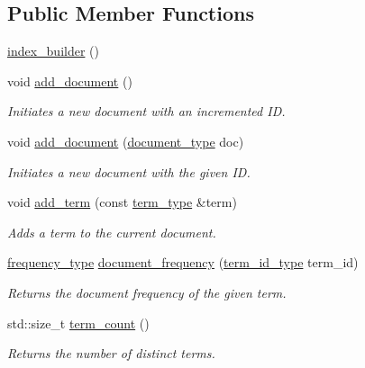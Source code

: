 \subsection*{Public Member Functions}
\begin{DoxyCompactItemize}
\item 
\mbox{\hyperlink{classirk_1_1index__builder_a00c690294474cf2ef39fcf94edc8b594}{index\+\_\+builder}} ()
\item 
void \mbox{\hyperlink{classirk_1_1index__builder_a005813bfb531005ce2ca54a9f7cfd261}{add\+\_\+document}} ()
\begin{DoxyCompactList}\small\item\em Initiates a new document with an incremented ID. \end{DoxyCompactList}\item 
void \mbox{\hyperlink{classirk_1_1index__builder_ac7c266fbf628b828059ac89b6f6ad1cc}{add\+\_\+document}} (\mbox{\hyperlink{classirk_1_1index__builder_a4230ae91e9f84c95ee99b3607c6e952e}{document\+\_\+type}} doc)
\begin{DoxyCompactList}\small\item\em Initiates a new document with the given ID. \end{DoxyCompactList}\item 
void \mbox{\hyperlink{classirk_1_1index__builder_a73e03d40562487c47ed14f6d2412c7ca}{add\+\_\+term}} (const \mbox{\hyperlink{classirk_1_1index__builder_ad80a8f10f3e72ed3b9a2f181350f3f1f}{term\+\_\+type}} \&term)
\begin{DoxyCompactList}\small\item\em Adds a term to the current document. \end{DoxyCompactList}\item 
\mbox{\hyperlink{classirk_1_1index__builder_af2efa68fc3f10fd9cb000d16279bfbb1}{frequency\+\_\+type}} \mbox{\hyperlink{classirk_1_1index__builder_ab760ed3512980d0d76395b21b354f45a}{document\+\_\+frequency}} (\mbox{\hyperlink{classirk_1_1index__builder_a6736f4a9aa142d3ca15c5e8c3b0a352f}{term\+\_\+id\+\_\+type}} term\+\_\+id)
\begin{DoxyCompactList}\small\item\em Returns the document frequency of the given term. \end{DoxyCompactList}\item 
std\+::size\+\_\+t \mbox{\hyperlink{classirk_1_1index__builder_a0ef10a3de8336e82fe5b03fc1b1ddd45}{term\+\_\+count}} ()
\begin{DoxyCompactList}\small\item\em Returns the number of distinct terms. \end{DoxyCompactList}\item 

\end{DoxyCompactItemize}
